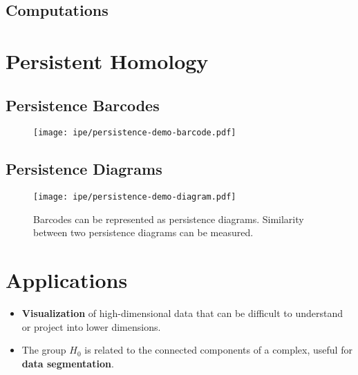\subsection{Computations}

\section[Persistence]{Persistent Homology}

\subsection{Persistence Barcodes}

\begin{figure}[h!]
    \begin{center}
        \texttt{[image: ipe/persistence-demo-barcode.pdf]}
    \end{center}
\end{figure}

\subsection{Persistence Diagrams}

\begin{figure}[h!]
    \begin{center}
        \texttt{[image: ipe/persistence-demo-diagram.pdf]}
    \end{center}
    \caption{Barcodes can be represented as persistence diagrams. Similarity between two persistence diagrams can be measured.}
\end{figure}

\section{Applications}

\begin{itemize}
    \item \textbf{Visualization} of high-dimensional data that can be difficult to understand or project into lower dimensions.
    \item The group \(H_0\) is related to the connected components of a complex, useful for \textbf{data segmentation}.
\end{itemize}

\newpage





